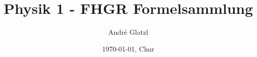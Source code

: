 \documentclass[11pt]{article}
\title{Physik 1 - FHGR Formelsammlung}
\author{André Glatzl}
\date{\today{}, Chur}
\begin{document}
\scriptsize

\end{document}
